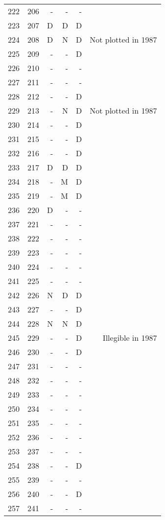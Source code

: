 \begin{longtable}{rrrrrr}
  222 & 206 & - & - & - &  \\ 
  223 & 207 & D & D & D &  \\ 
  224 & 208 & D & N & D & Not plotted in 1987 \\ 
  225 & 209 & - & - & D &  \\ 
  226 & 210 & - & - & - &  \\ 
  227 & 211 & - & - & - &  \\ 
  228 & 212 & - & - & D &  \\ 
  229 & 213 & - & N & D & Not plotted in 1987 \\ 
  230 & 214 & - & - & D &  \\ 
  231 & 215 & - & - & D &  \\ 
  232 & 216 & - & - & D &  \\ 
  233 & 217 & D & D & D &  \\ 
  234 & 218 & - & M & D &  \\ 
  235 & 219 & - & M & D &  \\ 
  236 & 220 & D & - & - &  \\ 
  237 & 221 & - & - & - &  \\ 
  238 & 222 & - & - & - &  \\ 
  239 & 223 & - & - & - &  \\ 
  240 & 224 & - & - & - &  \\ 
  241 & 225 & - & - & - &  \\ 
  242 & 226 & N & D & D &  \\ 
  243 & 227 & - & - & D &  \\ 
  244 & 228 & N & N & D &  \\ 
  245 & 229 & - & - & D & Illegible in 1987 \\ 
  246 & 230 & - & - & D &  \\ 
  247 & 231 & - & - & - &  \\ 
  248 & 232 & - & - & - &  \\ 
  249 & 233 & - & - & - &  \\ 
  250 & 234 & - & - & - &  \\ 
  251 & 235 & - & - & - &  \\ 
  252 & 236 & - & - & - &  \\ 
  253 & 237 & - & - & - &  \\ 
  254 & 238 & - & - & D &  \\ 
  255 & 239 & - & - & - &  \\ 
  256 & 240 & - & - & D &  \\ 
  257 & 241 & - & - & - &  \\ 

\end{longtable}
